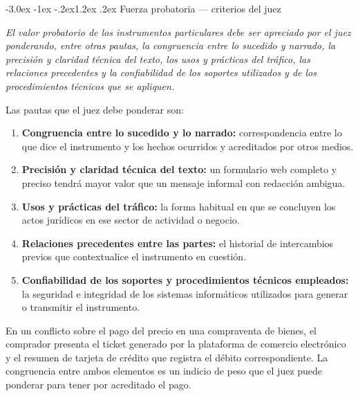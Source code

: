 \documentclass[12pt,oneside]{book}
\makeatletter
\renewcommand\section{\@startsection{section}{1}{\z@}%
  {-3.0ex \@plus -1ex \@minus -.2ex}{1.2ex \@plus .2ex}%
  {\normalfont\large\bfseries\color{acento}}}
\makeatother
\begin{document}
\section{Fuerza probatoria --- criterios del juez}

\begin{regla}
\textit{El valor probatorio de los instrumentos particulares debe ser apreciado por el juez ponderando, entre otras pautas, la congruencia entre lo sucedido y narrado, la precisión y claridad técnica del texto, los usos y prácticas del tráfico, las relaciones precedentes y la confiabilidad de los soportes utilizados y de los procedimientos técnicos que se apliquen.}
\end{regla}

Las pautas que el juez debe ponderar son:

\begin{enumerate}
    \item \textbf{Congruencia entre lo sucedido y lo narrado:} correspondencia entre lo que dice el instrumento y los hechos ocurridos y acreditados por otros medios.

    \item \textbf{Precisión y claridad técnica del texto:} un formulario web completo y preciso tendrá mayor valor que un mensaje informal con redacción ambigua.

    \item \textbf{Usos y prácticas del tráfico:} la forma habitual en que se concluyen los actos jurídicos en ese sector de actividad o negocio.

    \item \textbf{Relaciones precedentes entre las partes:} el historial de intercambios previos que contextualice el instrumento en cuestión.

    \item \textbf{Confiabilidad de los soportes y procedimientos técnicos empleados:} la seguridad e integridad de los sistemas informáticos utilizados para generar o transmitir el instrumento.
\end{enumerate}

\begin{ejemplo}
En un conflicto sobre el pago del precio en una compraventa de bienes, el comprador presenta el ticket generado por la plataforma de comercio electrónico y el resumen de tarjeta de crédito que registra el débito correspondiente. La congruencia entre ambos elementos es un indicio de peso que el juez puede ponderar para tener por acreditado el pago.
\end{ejemplo}
\end{document}
